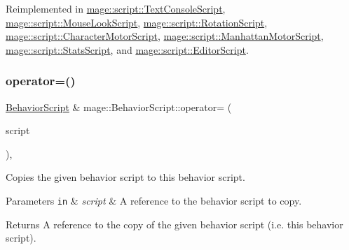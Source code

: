 Reimplemented in \mbox{\hyperlink{classmage_1_1script_1_1_text_console_script_a1e5a7bdff2d47b835932d7220a4e2571}{mage\+::script\+::\+Text\+Console\+Script}}, \mbox{\hyperlink{classmage_1_1script_1_1_mouse_look_script_a00c8dc8ebaf67da13bd0bc45de3ad8b6}{mage\+::script\+::\+Mouse\+Look\+Script}}, \mbox{\hyperlink{classmage_1_1script_1_1_rotation_script_a7da4165e899facc981c0ee5b1f4a4453}{mage\+::script\+::\+Rotation\+Script}}, \mbox{\hyperlink{classmage_1_1script_1_1_character_motor_script_a20699adf280bed4bfadd4a89d7df33c1}{mage\+::script\+::\+Character\+Motor\+Script}}, \mbox{\hyperlink{classmage_1_1script_1_1_manhattan_motor_script_ac93b09e8f82932f7071b1f591a8004e9}{mage\+::script\+::\+Manhattan\+Motor\+Script}}, \mbox{\hyperlink{classmage_1_1script_1_1_stats_script_a4bfada754da5ca76591c5e7b9b0b1f51}{mage\+::script\+::\+Stats\+Script}}, and \mbox{\hyperlink{classmage_1_1script_1_1_editor_script_af0804c603852f556d362f43e69240b2d}{mage\+::script\+::\+Editor\+Script}}.

\mbox{\label{classmage_1_1_behavior_script_adb153676123adadacf023e4f3804abf5}} 
\subsubsection{\texorpdfstring{operator=()}{operator=()}\hspace{0.1cm}{\footnotesize\ttfamily [1/2]}}
{\footnotesize\ttfamily \mbox{\hyperlink{classmage_1_1_behavior_script}{Behavior\+Script}} \& mage\+::\+Behavior\+Script\+::operator= (\begin{DoxyParamCaption}\item[{const \mbox{\hyperlink{classmage_1_1_behavior_script}{Behavior\+Script}} \&}]{script }\end{DoxyParamCaption})\hspace{0.3cm}{\ttfamily [default]}, {\ttfamily [noexcept]}}

Copies the given behavior script to this behavior script.


\begin{DoxyParams}[1]{Parameters}
\mbox{\tt in}  & {\em script} & A reference to the behavior script to copy. \\
\hline
\end{DoxyParams}
\begin{DoxyReturn}{Returns}
A reference to the copy of the given behavior script (i.\+e. this behavior script). 
\end{DoxyReturn}
\mbox{\label{classmage_1_1_behavior_script_aefeae227ee8d2452bf05782604f5011e}} 
